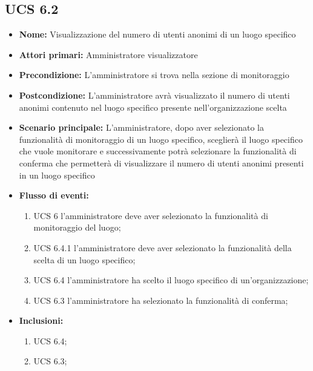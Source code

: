 \subsection{UCS 6.2}%
\begin{itemize}
	\item \textbf{Nome:} Visualizzazione del numero di utenti anonimi di un luogo specifico
	\item \textbf{Attori primari:} Amministratore visualizzatore
	\item \textbf{Precondizione:} L'amministratore si trova nella sezione di monitoraggio
	\item \textbf{Postcondizione:} L'amministratore avrà visualizzato il numero di utenti anonimi contenuto nel luogo specifico presente nell'organizzazione scelta
	\item \textbf{Scenario principale:}  L'amministratore, dopo aver selezionato la funzionalità di monitoraggio di un luogo specifico, sceglierà il luogo specifico che vuole monitorare e successivamente potrà selezionare la funzionalità di conferma che permetterà di visualizzare il numero di utenti anonimi presenti in un luogo specifico
	\item \textbf{Flusso di eventi:} 
	\begin{enumerate}
		\item UCS 6 l'amministratore deve aver selezionato la funzionalità di monitoraggio del luogo;
		\item UCS 6.4.1 l'amministratore deve aver selezionato la funzionalità della scelta di un luogo specifico;
		\item UCS 6.4 l'amministratore ha scelto il luogo specifico di un'organizzazione;
		\item UCS 6.3 l'amministratore ha selezionato la funzionalità di conferma;
	\end{enumerate}
	\item \textbf{Inclusioni:}
	\begin{enumerate}
		\item UCS 6.4;
		\item UCS 6.3;
	\end{enumerate}
\end{itemize}

